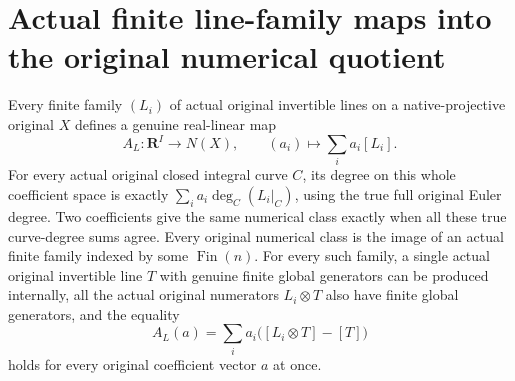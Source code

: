 \section{Actual finite line-family maps into the original numerical quotient}
\label{sec:native-numerical-line-family-maps}

\begin{theorem}
\label{thm:native-numerical-line-family-maps}
\leanok
{}
Every finite family $(L_i)$ of actual original invertible lines on a
native-projective original $X$ defines a genuine real-linear map
\[
 A_L:\mathbf R^I\longrightarrow N(X),\qquad
 (a_i)\longmapsto\sum_i a_i[L_i].
\]
For every actual original closed integral curve $C$, its degree on
this whole coefficient space is exactly
$\sum_i a_i\deg_C(L_i|_C)$, using the true full original Euler degree.
Two coefficients give the same numerical class exactly when all
these true curve-degree sums agree. Every original numerical class
is the image of an actual finite family indexed by some $\operatorname{Fin}(n)$.
For every such family, a single actual original invertible line $T$
with genuine finite global generators can be produced internally,
all the actual original numerators $L_i\otimes T$ also have finite
global generators, and the equality
\[
 A_L(a)=\sum_i a_i\bigl([L_i\otimes T]-[T]\bigr)
\]
holds for every original coefficient vector $a$ at once.
\end{theorem}

